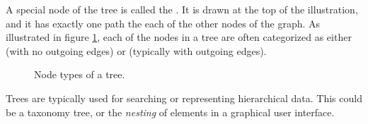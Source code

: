 A special node of the tree is called the . It is drawn at the top of the illustration, and it has exactly one path the each of the other nodes of the graph. As illustrated in figure \ref{fig:bs:graphs:trees:nodetypes}, each of the nodes in a tree are often categorized as either  (with no outgoing edges) or  (typically with outgoing edges).

\begin{figure}[tbp]
  
  \caption{Node types of a tree.}
  \label{fig:bs:graphs:trees:nodetypes}
\end{figure}

Trees are typically used for searching or representing hierarchical data. This could be a taxonomy tree, or the \textsl{nesting} of elements in a graphical user interface.


